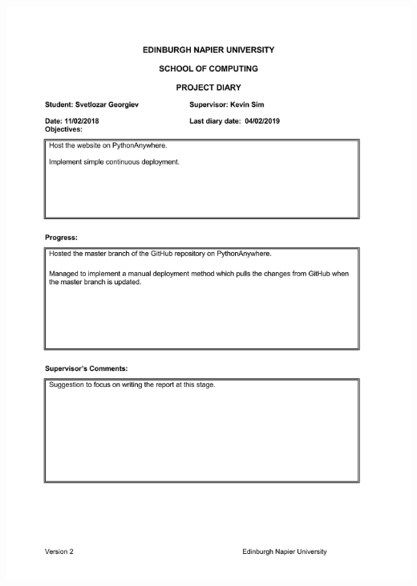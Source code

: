 \documentclass[12pt,a4paper]{article}
\begin{document}
\begin{appendices}
\includegraphics[width=\textwidth,height=\textheight,keepaspectratio]{s2week5.jpg}
\newpage

\end{appendices}
\end{document}
